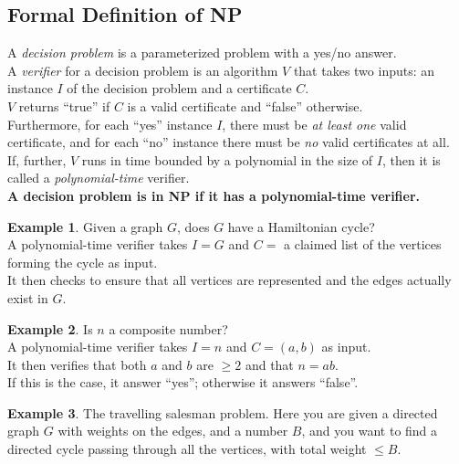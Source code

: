\documentclass[12pt]{article}
\theoremstyle{plain}
\theoremstyle{definition}
\newtheorem*{ex*}{Example}
\begin{document}
\subsection{Formal Definition of NP}
A \emph{decision problem} is a parameterized problem with a yes/no answer. \\

A \emph{verifier} for a decision problem is an algorithm $V$ that takes two inputs: an instance $I$ of the decision problem and a certificate $C$. \\
$V$ returns ``true'' if $C$ is a valid certificate and ``false'' otherwise. \\
Furthermore, for each ``yes'' instance $I$, there must be \emph{at least one} valid certificate, and for each ``no'' instance there must be \emph{no} valid certificates at all. \\
If, further, $V$ runs in time bounded by a polynomial in the size of $I$, then it is called a \emph{polynomial-time} verifier. \\

\textbf{A decision problem is in NP if it has a polynomial-time verifier.} \\

\begin{ex*}
Given a graph $G$, does $G$ have a Hamiltonian cycle? \\
A polynomial-time verifier takes $I = G$ and $C =$ a claimed list of the vertices forming the cycle as input. \\
It then checks to ensure that all vertices are represented and the edges actually exist in $G$.
\end{ex*}

\begin{ex*}
Is $n$ a composite number? \\
A polynomial-time verifier takes $I = n$ and $C = (a,b)$ as input. \\
It then verifies that both $a$ and $b$ are $\geq 2$ and that $n = ab$. \\
If this is the case, it answer ``yes'';
otherwise it answers ``false''.
\end{ex*}

\begin{ex*}
The travelling salesman problem.
Here you are given a directed graph $G$ with weights on the edges, and a number $B$, and you want to find a directed cycle passing through all the vertices, with total weight $\leq B$.
\end{ex*}
\end{document}
